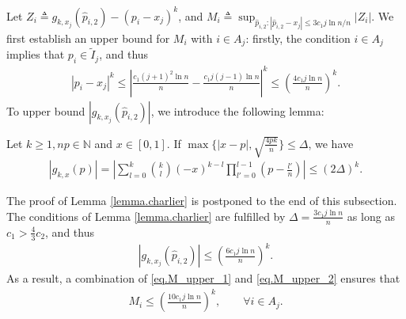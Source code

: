 \documentclass[final,12pt]{colt2018} %
\begin{document}
Let $Z_i\triangleq g_{k,x_j}(\hat{p}_{i,2}) - (p_i-x_j)^k$, and $M_i\triangleq \sup_{\hat{p}_{i,2}: |\hat{p}_{i,2}-x_j|\le 3c_1j\ln n/n} |Z_i|$. We first establish an upper bound for $M_i$ with $i\in A_j$: firstly, the condition $i\in A_j$ implies that $p_i\in \tilde{I}_j$, and thus
\begin{align}\label{eq.M_upper_1}
|p_i-x_j|^k \le \left|\frac{c_1(j+1)^2\ln n}{n}-\frac{c_1j(j-1)\ln n}{n}\right|^k \le \left(\frac{4c_1j\ln n}{n}\right)^k.
\end{align}
To upper bound $|g_{k,x_j}(\hat{p}_{i,2})|$, we introduce the following lemma:
\begin{lemma}\label{lemma.charlier}
	Let $k\ge 1, np\in \mathbb{N}$ and $x\in [0,1]$. If $\max\{|x-p|, \sqrt{\frac{4pk}{n}}\}\le \Delta$, we have
	\begin{align*}
	|g_{k,x}(p)| = \left|\sum_{l=0}^k \binom{k}{l}(-x)^{k-l}\prod_{l'=0}^{l-1}\left(p-\frac{l'}{n}\right)\right| \le (2\Delta)^k.
	\end{align*}
\end{lemma}
The proof of Lemma \ref{lemma.charlier} is postponed to the end of this subsection. The conditions of Lemma \ref{lemma.charlier} are fulfilled by $\Delta=\frac{3c_1j\ln n}{n}$ as long as $c_1>\frac{4}{3}c_2$, and thus
\begin{align}\label{eq.M_upper_2}
|g_{k,x_j}(\hat{p}_{i,2})| \le \left(\frac{6c_1j\ln n}{n}\right)^k.
\end{align}
As a result, a combination of \eqref{eq.M_upper_1} and \eqref{eq.M_upper_2} ensures that
\begin{align}\label{eq.M_upper}
M_i \le \left(\frac{10c_1j\ln n}{n}\right)^k, \qquad \forall i\in A_j.
\end{align}
\end{document}

